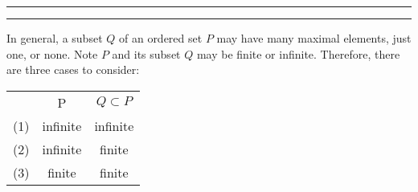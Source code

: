 \documentclass[12pt, letterpaper, oneside]{book}
\begin{document}
\noindent\rule{10cm}{0.4pt}\rule{1cm}{10pt}

In general, a subset $Q$ of an ordered set $P$ may have many maximal elements, just one, or none. Note $P$ and its
subset $Q$ may be finite or infinite. Therefore, there are three cases to consider:

\begin{table}[H]
  \centering
  \begin{tabular}{|c|c|c|}
    \cline{1-3}
        & P        & $Q \subset P$ \\ [1ex] \cline{1-3}
    (1) & infinite & infinite      \\ [0.5ex] \cline{1-3}
    (2) & infinite & finite        \\ [0.5ex] \cline{1-3}
    (3) & finite   & finite        \\ [0.5ex] \cline{1-3}
  \end{tabular}
\end{table}
\end{document}

